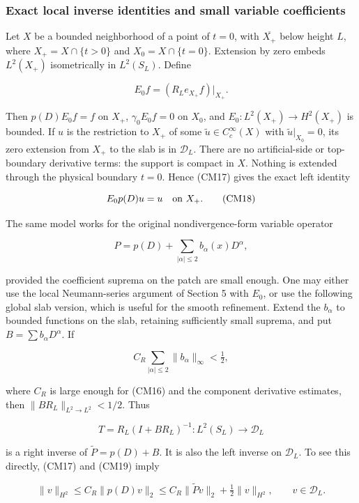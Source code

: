\documentclass[
  11pt,
]{article}
\begin{document}
\subsubsection{Exact local inverse identities and small variable
coefficients}\label{exact-local-inverse-identities-and-small-variable-coefficients}

Let \(X\) be a bounded neighborhood of a point of \(t=0\), with
\(\overline{X_+}\) below height \(L\), where \(X_+=X\cap\{t>0\}\) and
\(X_0=X\cap\{t=0\}\). Extension by zero embeds \(L^2(X_+)\)
isometrically in \(L^2(S_L)\). Define

\[
E_0 f=(R_Le_{X_+}f)|_{X_+}.
\]

Then \(p(D)E_0f=f\) on \(X_+\), \(\gamma_0E_0f=0\) on \(X_0\), and
\(E_0:L^2(X_+)\to H^2(X_+)\) is bounded. If \(u\) is the restriction to
\(X_+\) of some \(\widetilde u\in C_c^\infty(X)\) with
\(\widetilde u|_{X_0}=0\), its zero extension from \(X_+\) to the slab
is in \(\mathcal D_L\). There are no artificial-side or top-boundary
derivative terms: the support is compact in \(X\). Nothing is extended
through the physical boundary \(t=0\). Hence (CM17) gives the exact left
identity

\[
E_0p(D)u=u\quad\hbox{on }X_+.
\tag{CM18}
\]

The same model works for the original nondivergence-form variable
operator

\[
P=p(D)+\sum_{|\alpha|\leq2}b_\alpha(x)D^\alpha,
\]

provided the coefficient suprema on the patch are small enough. One may
either use the local Neumann-series argument of Section 5 with \(E_0\),
or use the following global slab version, which is useful for the smooth
refinement. Extend the \(b_\alpha\) to bounded functions on the slab,
retaining sufficiently small suprema, and put
\(B=\sum b_\alpha D^\alpha\). If

\[
C_R\sum_{|\alpha|\leq2}\|b_\alpha\|_\infty<\tfrac12,
\tag{CM19}
\]

where \(C_R\) is large enough for (CM16) and the component derivative
estimates, then \(\|BR_L\|_{L^2\to L^2}<1/2\). Thus

\[
T=R_L(I+BR_L)^{-1}:L^2(S_L)\longrightarrow\mathcal D_L
\tag{CM20}
\]

is a right inverse of \(\widetilde P=p(D)+B\). It is also the left
inverse on \(\mathcal D_L\). To see this directly, (CM17) and (CM19)
imply

\[
\|v\|_{H^2}
\leq C_R\|p(D)v\|_2
\leq C_R\|\widetilde Pv\|_2+\tfrac12\|v\|_{H^2},
\qquad v\in\mathcal D_L.
\tag{CM21}
\]
\end{document}
